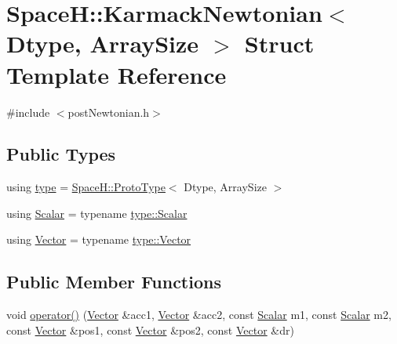 \hypertarget{struct_space_h_1_1_karmack_newtonian}{}\section{SpaceH\+:\+:Karmack\+Newtonian$<$ Dtype, Array\+Size $>$ Struct Template Reference}
\label{struct_space_h_1_1_karmack_newtonian}


{\ttfamily \#include $<$post\+Newtonian.\+h$>$}

\subsection*{Public Types}
\begin{DoxyCompactItemize}
\item 
using \mbox{\hyperlink{struct_space_h_1_1_karmack_newtonian_a1e7865ad1ed3b6f158f83af6575db27d}{type}} = \mbox{\hyperlink{struct_space_h_1_1_proto_type}{Space\+H\+::\+Proto\+Type}}$<$ Dtype, Array\+Size $>$
\item 
using \mbox{\hyperlink{struct_space_h_1_1_karmack_newtonian_ae3b4407bf4803cf861b7bdf0d117c4bb}{Scalar}} = typename \mbox{\hyperlink{struct_space_h_1_1_proto_type_af3c8245d83d9db64749882920de5c274}{type\+::\+Scalar}}
\item 
using \mbox{\hyperlink{struct_space_h_1_1_karmack_newtonian_a7c009d5759bb0bb17376432619394e4f}{Vector}} = typename \mbox{\hyperlink{struct_space_h_1_1_proto_type_a316b81f4660b2b4fab14a8e1f23b6089}{type\+::\+Vector}}
\end{DoxyCompactItemize}
\subsection*{Public Member Functions}
\begin{DoxyCompactItemize}
\item 
void \mbox{\hyperlink{struct_space_h_1_1_karmack_newtonian_af941c7ffd20d15e5f7fbbdde88a617c2}{operator()}} (\mbox{\hyperlink{struct_space_h_1_1_karmack_newtonian_a7c009d5759bb0bb17376432619394e4f}{Vector}} \&acc1, \mbox{\hyperlink{struct_space_h_1_1_karmack_newtonian_a7c009d5759bb0bb17376432619394e4f}{Vector}} \&acc2, const \mbox{\hyperlink{struct_space_h_1_1_karmack_newtonian_ae3b4407bf4803cf861b7bdf0d117c4bb}{Scalar}} m1, const \mbox{\hyperlink{struct_space_h_1_1_karmack_newtonian_ae3b4407bf4803cf861b7bdf0d117c4bb}{Scalar}} m2, const \mbox{\hyperlink{struct_space_h_1_1_karmack_newtonian_a7c009d5759bb0bb17376432619394e4f}{Vector}} \&pos1, const \mbox{\hyperlink{struct_space_h_1_1_karmack_newtonian_a7c009d5759bb0bb17376432619394e4f}{Vector}} \&pos2, const \mbox{\hyperlink{struct_space_h_1_1_karmack_newtonian_a7c009d5759bb0bb17376432619394e4f}{Vector}} \&dr)
\end{DoxyCompactItemize}


